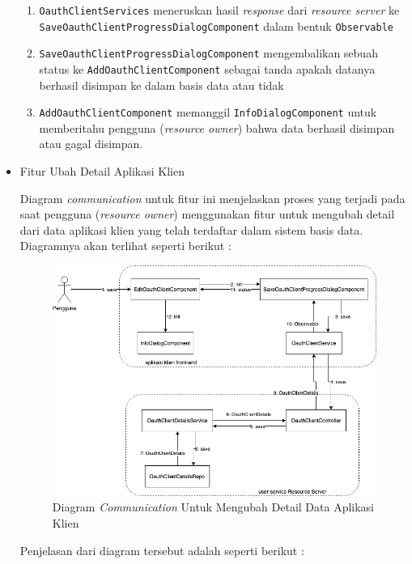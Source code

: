 \documentclass[pdftex,12pt, oneside]{article}
\begin{document}
\begin{itemize}
\begin{enumerate}
		\item \texttt{OauthClientServices} meneruskan hasil \textit{response} dari \textit{resource server} ke \texttt{SaveOauthClientProgressDialogComponent} dalam bentuk \texttt{Observable}
		
		\item \texttt{SaveOauthClientProgressDialogComponent} mengembalikan sebuah status ke \texttt{AddOauthClientComponent} sebagai tanda apakah datanya berhasil disimpan ke dalam basis data atau tidak
		
		\item \texttt{AddOauthClientComponent} memanggil \texttt{InfoDialogComponent} untuk memberitahu pengguna (\textit{resource owner}) bahwa data berhasil disimpan atau gagal disimpan.
	\end{enumerate}
	
	\item Fitur Ubah Detail Aplikasi Klien
	
	Diagram \textit{communication} untuk fitur ini menjelaskan proses yang terjadi pada saat pengguna (\textit{resource owner}) menggunakan fitur untuk mengubah detail dari data aplikasi klien yang telah terdaftar dalam sistem basis data. Diagramnya akan terlihat seperti berikut :
	
	\begin{figure}[H]
		\centering
		\includegraphics[width=1\textwidth]{./resources/comm-dia-edit-client}
		\caption{Diagram \textit{Communication} Untuk Mengubah Detail Data Aplikasi Klien}
		\label{fig:comm-dia-edit-client}
	\end{figure}
	
	Penjelasan dari diagram tersebut adalah seperti berikut :
	

\end{itemize}
\end{document}
